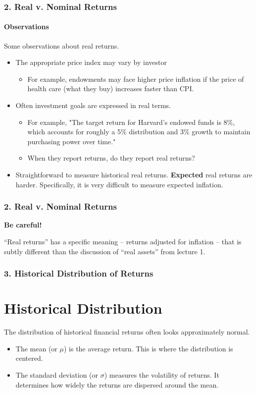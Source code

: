 \documentclass{beamer}
\begin{document}
\begin{frame}[t]
    \frametitle{2. Real v. Nominal Returns}
    \framesubtitle{Observations}

    Some observations about real returns.\\
    \begin{itemize}
      \item The appropriate price index may vary by investor
        \begin{itemize}        
        \item {\footnotesize For example, endowments may face higher price inflation if the price of health care (what they buy) increases faster than CPI.}
      \end{itemize}
      \item Often investment goals are expressed in real terms.  
      \begin{itemize}        
        \item {\footnotesize For example, "The target return for Harvard's endowed funds is 8\%, which accounts for roughly a 5\% distribution and 3\% growth to maintain purchasing power over time."}
        \item When they report returns, do they report real returns?
      \end{itemize}
      \item Straightforward to measure historical real returns.   \textbf{Expected} real returns are harder.   Specifically, it is very difficult to measure expected inflation.
    \end{itemize}
\end{frame}

\begin{frame}[t]
    \frametitle{2. Real v. Nominal Returns}

    \textbf{Be careful!}
    \vspace{1em}
    
    “Real returns” has a specific meaning – returns adjusted for inflation -- that is subtly different than the discussion of “real assets” from lecture 1.

\end{frame}

\begin{frame}[t]
    \frametitle{3. Historical Distribution of Returns}
    \section{Historical Distribution}

    The distribution of historical financial returns often looks
    approximately normal.

    \begin{itemize}
        \item The mean (or $\mu$) is the average return. This is where
        the distribution is centered.

        \item The standard deviation (or $\sigma$) measures the
        volatility of returns. It determines how widely the returns
        are dispersed around the mean.
    \end{itemize}

\end{frame}
\end{document}
